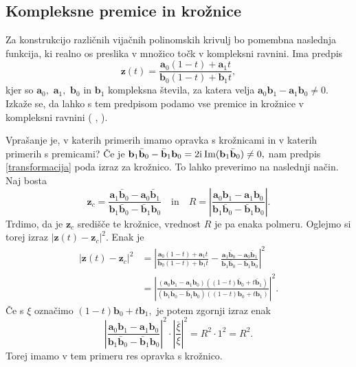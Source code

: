 \documentclass[12pt,a4paper,twoside]{article}
\newcommand{\iu}{\mathrm{i}\mkern1mu} %
\theoremstyle{definition} %
\theoremstyle{plain} %
\theoremstyle{primerstyle}
\numberwithin{equation}{section}  %
\newcommand{\aV}{\mathbf{a}}
\newcommand{\bV}{\mathbf{b}}
\newcommand{\zV}{\mathbf{z}}
\DeclareMathOperator{\ImC}{Im}
\begin{document}
\subsection{Kompleksne premice in krožnice}
\label{poglavje_kompleksne_premice_kroznice}

Za konstrukcijo različnih vijačnih polinomskih krivulj bo pomembna naslednja funkcija, ki realno os preslika v množico točk v kompleksni ravnini. Ima predpis
\begin{equation}
	\label{transformacija}
	\zV(t)=\frac{\aV_0(1-t)+\aV_1t}{\bV_0(1-t)+\bV_1t},
\end{equation}
kjer so $\aV_0,$ $\aV_1,$ $\bV_0$ in $\bV_1$ kompleksna števila, za katera velja $\aV_0\bV_1-\aV_1\bV_0\neq 0.$ Izkaže se, da lahko s tem predpisom podamo vse premice in krožnice v kompleksni ravnini ( \cite{schwerdtfeger2020geometry}, \cite{needham1998visual}).

Vprašanje je, v katerih primerih imamo opravka s krožnicami in v katerih primerih s premicami?
Če je $\bV_1\bar{\bV}_0-\bar{\bV}_1\bV_0=2\iu\ImC(\bV_1\bar{\bV}_0)\neq 0,$ nam predpis \eqref{transformacija} poda izraz za krožnico. To lahko preverimo na naslednji način. Naj bosta
\begin{equation*}
	\zV_c=\frac{\aV_1\bar{\bV}_0-\aV_0\bar{\bV}_1}{\bV_1\bar{\bV}_0-\bar{\bV}_1\bV_0}\quad\text{in}\quad R=\left|\frac{\aV_0\bV_1-\aV_1\bV_0}{\bV_1\bar{\bV}_0-\bar{\bV}_1\bV_0}\right|.
\end{equation*}
Trdimo, da je $\zV_c$ središče te krožnice, vrednost $R$ je pa enaka polmeru. Oglejmo si torej izraz $|\zV(t)-\zV_c|^2.$ Enak je
\begin{align*}
	|\zV(t)-\zV_c|^2&=\left|\frac{\aV_0(1-t)+\aV_1t}{\bV_0(1-t)+\bV_1t}-\frac{\aV_1\bar{\bV}_0-\aV_0\bar{\bV}_1}{\bV_1\bar{\bV}_0-\bar{\bV}_1\bV_0}\right|^2\\
	&=\left|\frac{(\aV_0\bV_1-\aV_1\bV_0)((1-t)\bar{\bV}_0+t\bar{\bV}_1)}{(\bV_1\bar{\bV}_0-\bar{\bV}_1\bV_0)((1-t)\bV_0+t\bV_1)}\right|^2.
\end{align*}
Če s $\xi$ označimo $(1-t)\bV_0+t\bV_1,$ je potem zgornji izraz enak
\begin{equation*}
	\left|\frac{\aV_0\bV_1-\aV_1\bV_0}{\bV_1\bar{\bV}_0-\bar{\bV}_1\bV_0}\right|^2\cdot\left|\frac{\bar{\xi}}{\xi}\right|^2=R^2\cdot1^2=R^2.
\end{equation*}
Torej imamo v tem primeru res opravka s krožnico.
\end{document}
